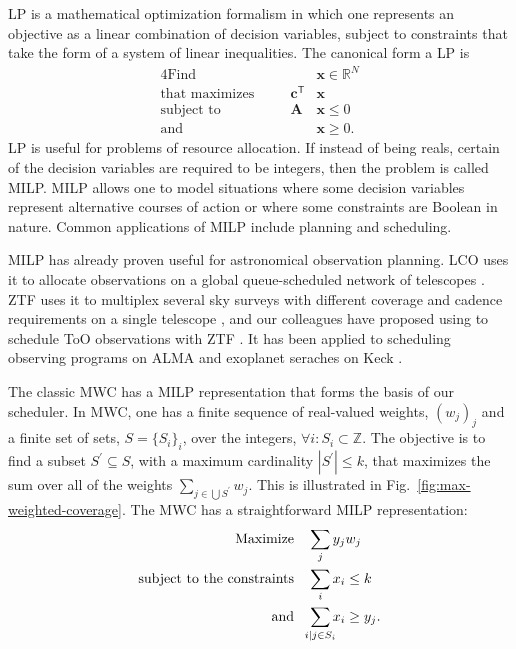 \documentclass[twocolumn,times]{aastex631}
\begin{document}
\Ac{LP} is a mathematical optimization formalism in which one represents an objective as a linear combination of decision variables, subject to constraints that take the form of a system of linear inequalities. The canonical form a \ac{LP} is
%
\begin{alignat*}{4}
    \text{Find}\quad && &\mathbf{x} \in \mathbb{R}^N \\
    \text{that maximizes}\quad && \mathbf{c}^\mathsf{T} &\mathbf{x} \\
    \text{subject to}\quad && \mathbf{A} &\mathbf{x} \leq 0 \\
    \text{and}\quad && &\mathbf{x} \geq 0.
\end{alignat*}
%
\ac{LP} is useful for problems of resource allocation. If instead of being reals, certain of the decision variables are required to be integers, then the problem is called \acf{MILP}. \ac{MILP} allows one to model situations where some decision variables represent alternative courses of action or where some constraints are Boolean in nature. Common applications of \ac{MILP} include planning and scheduling.

\ac{MILP} has already proven useful for astronomical observation planning. \ac{LCO} uses it to allocate observations on a global queue-scheduled network of telescopes \citep{2014SPIE.9149E..0ES}. \ac{ZTF} uses it to multiplex several sky surveys with different coverage and cadence requirements on a single telescope \citep{2019PASP..131f8003B}, and our colleagues have proposed using to schedule \ac{ToO} observations with \ac{ZTF} \citep{2022ApJ...935...87P}. It has been applied to scheduling observing programs on \ac{ALMA} \citep{2016A&C....15...90S} and exoplanet seraches on Keck \citep{2024AJ....167...33H}.

The classic \ac{MWC} has a \ac{MILP} representation that forms the basis of our scheduler. In \ac{MWC}, one has a finite sequence of real-valued weights, $(w_j)_j$ and a finite set of sets, $S = \{S_i\}_i$, over the integers, $\forall i: S_i \subset \mathbb{Z}$. The objective is to find a subset $S^\prime \subseteq S$, with a maximum cardinality $|S^\prime| \leq k$, that maximizes the sum over all of the weights $\sum_{j \in \bigcup S^\prime} w_j$. This is illustrated in Fig.~\ref{fig:max-weighted-coverage}. The \ac{MWC} has a straightforward \ac{MILP} representation:
%
\begin{align*}
\text{Maximize}\quad &\sum_j y_j w_j \\
\text{subject to the constraints}\quad &\sum_i x_i \leq k \\
\text{and}\quad &\sum_{\mathclap{i \mid j \in S_i}} x_i \geq y_j.
\end{align*}
\end{document}
